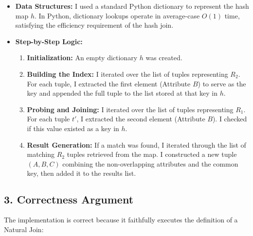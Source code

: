 \documentclass[11pt]{article}
\begin{document}
\begin{itemize}
    \item \textbf{Data Structures:} I used a standard Python dictionary to represent the hash map $h$. In Python, dictionary lookups operate in average-case $O(1)$ time, satisfying the efficiency requirement of the hash join.
    
    \item \textbf{Step-by-Step Logic:}
    \begin{enumerate}
        \item \textbf{Initialization:} An empty dictionary $h$ was created.
        \item \textbf{Building the Index:} I iterated over the list of tuples representing $R_2$. For each tuple, I extracted the first element (Attribute $B$) to serve as the key and appended the full tuple to the list stored at that key in $h$.
        \item \textbf{Probing and Joining:} I iterated over the list of tuples representing $R_1$. For each tuple $t'$, I extracted the second element (Attribute $B$). I checked if this value existed as a key in $h$.
        \item \textbf{Result Generation:} If a match was found, I iterated through the list of matching $R_2$ tuples retrieved from the map. I constructed a new tuple $(A, B, C)$ combining the non-overlapping attributes and the common key, then added it to the results list.
    \end{enumerate}
\end{itemize}

\subsection*{3. Correctness Argument}
The implementation is correct because it faithfully executes the definition of a Natural Join:
\end{document}

